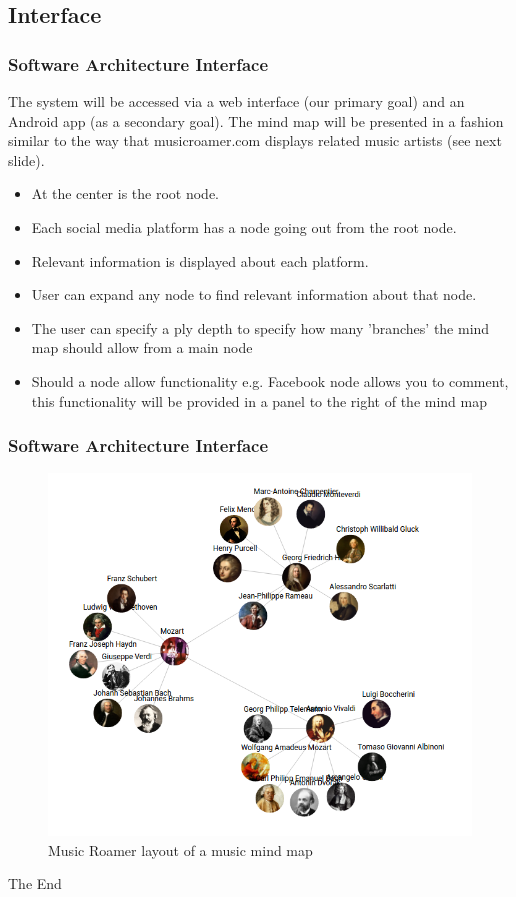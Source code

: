 \documentclass{beamer}
\begin{document}
	\subsection{Interface}
		\begin{frame}
		\frametitle{Software Architecture Interface}
			The system will be accessed via a web interface (our primary goal) and an Android app (as a secondary goal). The mind map will be presented in a fashion similar to the way that musicroamer.com displays related music artists (see next slide).
			
			\begin{itemize}
				\item At the center is the root node.
				\item Each social media platform has a node going out from the root node.
				\item Relevant information is displayed about each platform.
				\item User can expand any node to find relevant information about that node.
				\item The user can specify a ply depth to specify how many 'branches' the mind map should allow from a main node
				\item Should a node allow functionality e.g. Facebook node allows you to comment, this functionality will be provided in a panel to the right of the mind map
			\end{itemize}
		\end{frame}
		\begin{frame}
		\frametitle{Software Architecture Interface}
			\begin{figure}
				\includegraphics[scale=0.3]{musicroamer.png}
				\caption{Music Roamer layout of a music mind map}
			\end{figure}
		\end{frame}

		\begin{frame}
			\Huge{\centerline{The End}}
		\end{frame}
\end{document}
